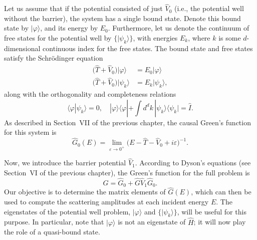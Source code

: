 \documentclass[pra,12pt]{revtex4}
\begin{document}
Let us assume that if the potential consisted of just $\hat{V}_0$
(i.e., the potential well without the barrier), the system has a
single bound state.  Denote this bound state by $|\varphi\rangle$, and
its energy by $E_0$.  Furthermore, let us denote the continuum of free
states for the potential well by $\{|\psi_k\rangle\}$, with energies
$E_k$, where $k$ is some $d$-dimensional continuous index for the free
states.  The bound state and free states satisfy the Schr\"odinger
equation
$$\begin{aligned}\big(\hat{T} + \hat{V}_0\big) |\varphi\rangle &= E_0 |\varphi\rangle \\ \big(\hat{T} + \hat{V}_0\big) |\psi_k\rangle &= E_k |\psi_k\rangle,
\end{aligned}$$
along with the orthogonality and completeness relations
$$\langle\varphi|\psi_k\rangle = 0, \quad |\varphi\rangle\langle\varphi| + \int d^dk\, |\psi_k\rangle\langle\psi_k| = \hat{I}.$$
As described in Section~VII of the previous chapter, the causal
Green's function for this system is
$$\hat{G}_0(E) = \lim_{\varepsilon\rightarrow0^+} \Big(E - \hat{T} - \hat{V}_0 + i\varepsilon\Big)^{-1}.$$

Now, we introduce the barrier potential $\hat{V}_1$.  According to
Dyson's equations (see Section~VI of the previous chapter), the
Green's function for the full problem is
$$\hat{G} = \hat{G}_0 + \hat{G} \hat{V}_1 \hat{G}_0.$$
Our objective is to determine the matrix elements of $\hat{G}(E)$,
which can then be used to compute the scattering amplitudes at each
incident energy $E$.  The eigenstates of the potential well problem,
$|\varphi\rangle$ and $\{|\psi_k\rangle\}$, will be useful for this
purpose.  In particular, note that $|\varphi\rangle$ is not an
eigenstate of $\hat{H}$; it will now play the role of a quasi-bound
state.
\end{document}
